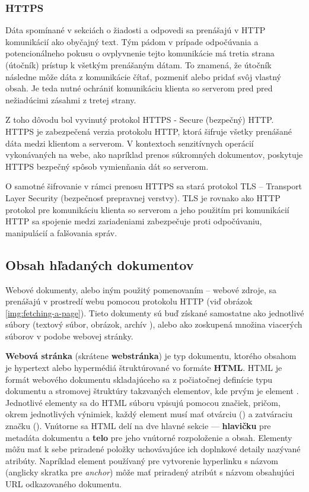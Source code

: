 \subsubsection{HTTPS}

Dáta spomínané v sekciách o žiadosti a odpovedi sa prenášajú v HTTP komunikácií ako obyčajný text. 
Tým pádom v prípade odpočúvania a potencionálneho pokusu o ovplyvnenie tejto komunikácie má tretia strana (útočník) prístup k všetkým prenášaným dátam. 
To znamená, že útočník následne môže dáta z komunikácie čítať, pozmeniť alebo pridať svôj vlastný obsah. 
Je teda nutné ochrániť komunikáciu klienta so serverom pred pred nežiadúcimi zásahmi z tretej strany.

Z toho dôvodu bol vyvinutý protokol HTTPS - Secure (bezpečný) HTTP.
HTTPS je zabezpečená verzia protokolu HTTP, ktorá šifruje všetky prenášané dáta medzi klientom a serverom.
V kontextoch senzitívnych operácií vykonávaných na webe, ako napríklad prenos súkromných dokumentov, poskytuje HTTPS bezpečný spôsob vymienňania dát so serverom.

O samotné šifrovanie v rámci prenosu HTTPS sa stará protokol TLS -- Transport Layer Security (bezpečnosť prepravnej verstvy).
TLS je rovnako ako HTTP protokol pre komunikáciu klienta so serverom a jeho použitím pri komunikácií HTTP sa spojenie medzi zariadeniami zabezpečuje proti odpočúvaniu, manipulácií a falšovania správ. 



\subsection{Obsah hľadaných dokumentov}
\label{obsah-hladanych-dokumentov}

Webové dokumenty, alebo iným použitý pomenovaním -- webové zdroje, sa prenášajú v prostredí webu pomocou protokolu HTTP (viď obrázok \ref{img:fetching-a-page}).
Tieto dokumenty sú buď získané samostatne ako jednotlivé súbory (textový súbor, obrázok, archív ), alebo ako zoskupená množina viacerých súborov v podobe webovej stránky.

\textbf{Webová stránka} (skrátene \textbf{webstránka}) je typ dokumentu, ktorého obsahom je hypertext alebo hypermédiá štruktúrované vo formáte \textbf{HTML}.
HTML je formát webového dokumentu skladajúceho sa z počiatočnej definície typu dokumentu a stromovej štruktúry takzvaných elementov, kde prvým je element . 
Jednotlivé elementy sa do HTML súboru vpisujú pomocou značiek, pričom, okrem jednotlivých výnimiek, 
každý element musí mať otvárciu () a zatváraciu značku ().
Vnútorne sa HTML delí na dve hlavné sekcie --- \textbf{hlavičku} pre metadáta dokumentu a \textbf{telo} pre jeho vnútorné rozpoloženie a obsah.
Elementy môžu mať k sebe priradené položky uchovávajúce ich doplnkové detaily nazývané atribúty. 
Napríklad element používaný pre vytvorenie hyperlinku s názvom  (anglicky skratka pre \textit{anchor}) 
môže mať priradený atribút s názvom  obsahujúci URL odkazovaného dokumentu.

